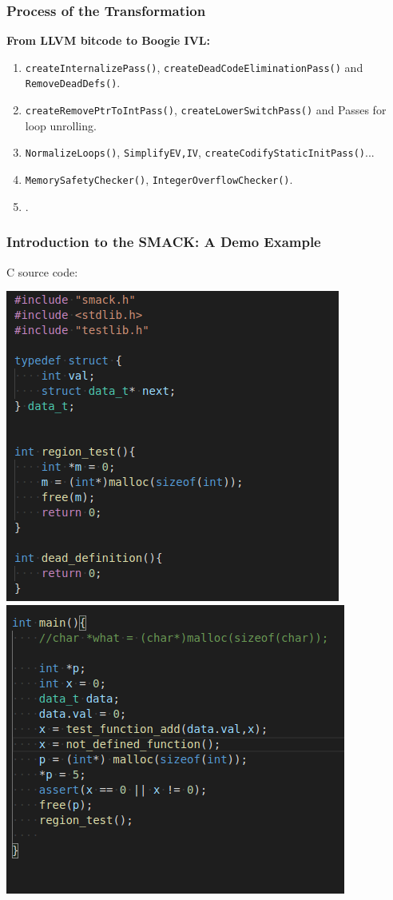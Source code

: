 \documentclass[11pt]{beamer}
\begin{document}
\iffalse
\begin{frame}\frametitle{Process of the Transformation}
\textbf{From LLVM bitcode to Boogie IVL:}
\begin{enumerate}
\item  \texttt{createInternalizePass()},  \texttt{createDeadCodeEliminationPass()} and \texttt{RemoveDeadDefs()}.
\item \texttt{createRemovePtrToIntPass()}, \texttt{createLowerSwitchPass()} and Passes for loop unrolling.
\item \texttt{NormalizeLoops()}, \texttt{SimplifyEV,IV}, \texttt{createCodifyStaticInitPass()}...
\item \texttt{MemorySafetyChecker()}, \texttt{IntegerOverflowChecker()}.
\item {}.
\end{enumerate}


\end{frame}
\begin{frame}\frametitle{Introduction to the SMACK: A Demo Example}
C source code:
\begin{center}
\includegraphics[scale=0.35]{example_code1.png}
\includegraphics[scale=0.35]{example_code2.png}
\end{center}

\end{frame}
\end{document}
